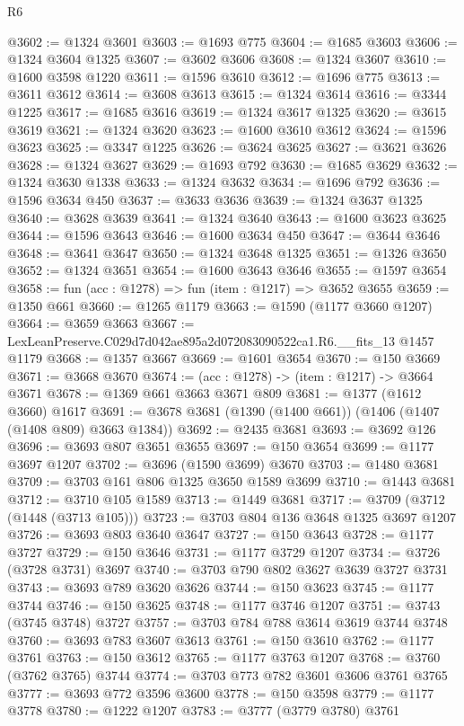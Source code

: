 \begin{lexlean}{R6}
\begin{coremodule}
@3602 := @1324 @3601
@3603 := @1693 @775
@3604 := @1685 @3603
@3606 := @1324 @3604 @1325
@3607 := @3602 @3606
@3608 := @1324 @3607
@3610 := @1600 @3598 @1220
@3611 := @1596 @3610
@3612 := @1696 @775
@3613 := @3611 @3612
@3614 := @3608 @3613
@3615 := @1324 @3614
@3616 := @3344 @1225
@3617 := @1685 @3616
@3619 := @1324 @3617 @1325
@3620 := @3615 @3619
@3621 := @1324 @3620
@3623 := @1600 @3610 @3612
@3624 := @1596 @3623
@3625 := @3347 @1225
@3626 := @3624 @3625
@3627 := @3621 @3626
@3628 := @1324 @3627
@3629 := @1693 @792
@3630 := @1685 @3629
@3632 := @1324 @3630 @1338
@3633 := @1324 @3632
@3634 := @1696 @792
@3636 := @1596 @3634 @450
@3637 := @3633 @3636
@3639 := @1324 @3637 @1325
@3640 := @3628 @3639
@3641 := @1324 @3640
@3643 := @1600 @3623 @3625
@3644 := @1596 @3643
@3646 := @1600 @3634 @450
@3647 := @3644 @3646
@3648 := @3641 @3647
@3650 := @1324 @3648 @1325
@3651 := @1326 @3650
@3652 := @1324 @3651
@3654 := @1600 @3643 @3646
@3655 := @1597 @3654
@3658 := fun (acc : @1278) => fun (item : @1217) => @3652 @3655
@3659 := @1350 @661
@3660 := @1265 @1179
@3663 := @1590 (@1177 @3660 @1207)
@3664 := @3659 @3663
@3667 := LexLeanPreserve.C029d7d042ae895a2d072083090522ca1.R6.__fits_13 @1457 @1179
@3668 := @1357 @3667
@3669 := @1601 @3654
@3670 := @150 @3669
@3671 := @3668 @3670
@3674 := (acc : @1278) -> (item : @1217) -> @3664 @3671
@3678 := @1369 @661 @3663 @3671 @809
@3681 := @1377 (@1612 @3660) @1617
@3691 := @3678 @3681 (@1390 (@1400 @661)) (@1406 (@1407 (@1408 @809) @3663 @1384))
@3692 := @2435 @3681
@3693 := @3692 @126
@3696 := @3693 @807 @3651 @3655
@3697 := @150 @3654
@3699 := @1177 @3697 @1207
@3702 := @3696 (@1590 @3699) @3670
@3703 := @1480 @3681
@3709 := @3703 @161 @806 @1325 @3650 @1589 @3699
@3710 := @1443 @3681
@3712 := @3710 @105 @1589
@3713 := @1449 @3681
@3717 := @3709 (@3712 (@1448 (@3713 @105)))
@3723 := @3703 @804 @136 @3648 @1325 @3697 @1207
@3726 := @3693 @803 @3640 @3647
@3727 := @150 @3643
@3728 := @1177 @3727
@3729 := @150 @3646
@3731 := @1177 @3729 @1207
@3734 := @3726 (@3728 @3731) @3697
@3740 := @3703 @790 @802 @3627 @3639 @3727 @3731
@3743 := @3693 @789 @3620 @3626
@3744 := @150 @3623
@3745 := @1177 @3744
@3746 := @150 @3625
@3748 := @1177 @3746 @1207
@3751 := @3743 (@3745 @3748) @3727
@3757 := @3703 @784 @788 @3614 @3619 @3744 @3748
@3760 := @3693 @783 @3607 @3613
@3761 := @150 @3610
@3762 := @1177 @3761
@3763 := @150 @3612
@3765 := @1177 @3763 @1207
@3768 := @3760 (@3762 @3765) @3744
@3774 := @3703 @773 @782 @3601 @3606 @3761 @3765
@3777 := @3693 @772 @3596 @3600
@3778 := @150 @3598
@3779 := @1177 @3778
@3780 := @1222 @1207
@3783 := @3777 (@3779 @3780) @3761

\end{coremodule}
\end{lexlean}
